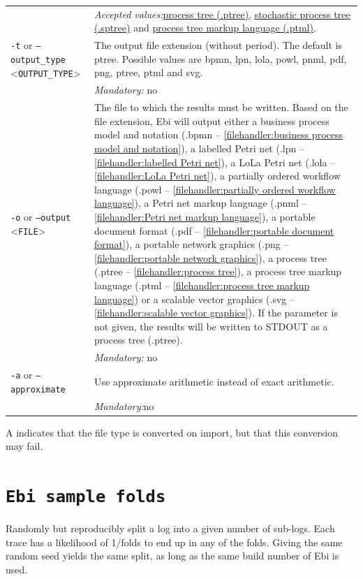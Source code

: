 {\begin{tabularx}{\linewidth}{lX}
&\textit{Accepted values:}\quad \hyperref[filehandler:process tree]{process tree (.ptree)}, \hyperref[filehandler:stochastic process tree]{stochastic process tree (.sptree)} and \hyperref[filehandler:process tree markup language]{process tree markup language (.ptml)}.\\
\texttt{-t} or \texttt{--output\_type} <\texttt{OUTPUT\_TYPE}> &
The output file extension (without period). The default is ptree. Possible values are bpmn, lpn, lola, powl, pnml, pdf, png, ptree, ptml and svg.\\
&\textit{Mandatory:} \quad no\\
\texttt{-o} or \texttt{--output} <\texttt{FILE}> &
The file to which the results must be written. Based on the file extension, Ebi will output either a business process model and notation (.bpmn -- \cref{filehandler:business process model and notation}), a labelled Petri net (.lpn -- \cref{filehandler:labelled Petri net}), a LoLa Petri net (.lola -- \cref{filehandler:LoLa Petri net}), a partially ordered workflow language (.powl -- \cref{filehandler:partially ordered workflow language}), a Petri net markup language (.pnml -- \cref{filehandler:Petri net markup language}), a portable document format (.pdf -- \cref{filehandler:portable document format}), a portable network graphics (.png -- \cref{filehandler:portable network graphics}), a process tree (.ptree -- \cref{filehandler:process tree}), a process tree markup language (.ptml -- \cref{filehandler:process tree markup language}) or a scalable vector graphics (.svg -- \cref{filehandler:scalable vector graphics}).
If the parameter is not given, the results will be written to STDOUT as a process tree (.ptree).\\
&\textit{Mandatory:} \quad no\\
\texttt{-a} or \texttt{--approximate} & Use approximate arithmetic instead of exact arithmetic.\\
&\textit{Mandatory:}\quad no\\
\bottomrule
\end{tabularx}
A \textdagger{} indicates that the file type is converted on import, but that this conversion may fail.
\clearpage\section{\texttt{Ebi sample folds}}
\label{command:Ebi sample folds}
Randomly but reproducibly split a log into a given number of sub-logs. Each trace has a likelihood of 1/folds to end up in any of the folds. Giving the same random seed yields the same split, as long as the same build number of Ebi is used. 
        

}
